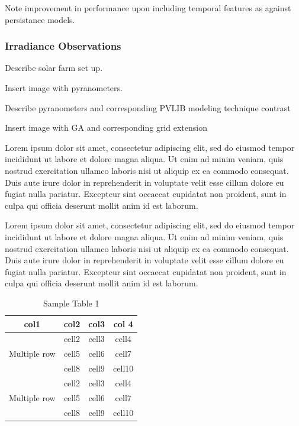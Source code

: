 \par Note improvement in performance upon including temporal features as against persistance models.

\subsubsection*{Irradiance Observations}
\par Describe solar farm set up.

\par Insert image with pyranometers.

\par Describe pyranometers and corresponding PVLIB modeling technique contrast


\par Insert image with GA and corresponding grid extension

Lorem ipsum dolor sit amet, consectetur adipiscing elit, sed do eiusmod tempor incididunt ut labore et dolore magna aliqua. Ut enim ad minim veniam, quis nostrud exercitation ullamco laboris nisi ut aliquip ex ea commodo consequat. Duis aute irure dolor in reprehenderit in voluptate velit esse cillum dolore eu fugiat nulla pariatur. Excepteur sint occaecat cupidatat non proident, sunt in culpa qui officia deserunt mollit anim id est laborum.

Lorem ipsum dolor sit amet, consectetur adipiscing elit, sed do eiusmod tempor incididunt ut labore et dolore magna aliqua. Ut enim ad minim veniam, quis nostrud exercitation ullamco laboris nisi ut aliquip ex ea commodo consequat. Duis aute irure dolor in reprehenderit in voluptate velit esse cillum dolore eu fugiat nulla pariatur. Excepteur sint occaecat cupidatat non proident, sunt in culpa qui officia deserunt mollit anim id est laborum.

\begin{table}[h]
\begin{center}
    \caption{Sample Table 1}
    \begin{tabular}{ c c c c }
    	\toprule
    	col1 & col2 & col3 & col 4 \\
    	\midrule
    	\multirow{3}{4em}{Multiple row} & cell2 & cell3 & cell4\\ &
    	cell5 & cell6 & cell7 \\ &
    	cell8 & cell9 & cell10 \\
    	\midrule
    	\multirow{3}{4em}{Multiple row} & cell2 & cell3 & cell4 \\ &
    	cell5 & cell6 & cell7 \\ &
    	cell8 & cell9 & cell10 \\
    	\bottomrule
    \end{tabular}
\end{center}
\end{table}

